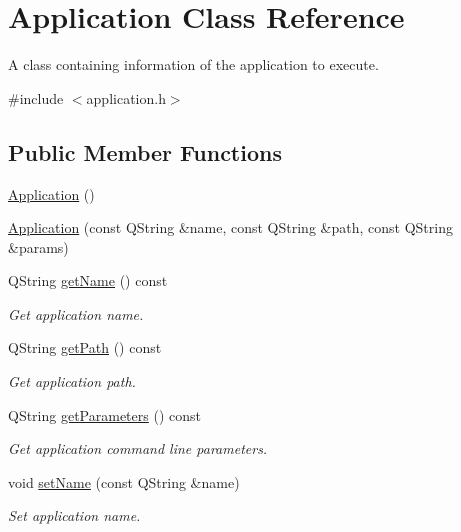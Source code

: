 \hypertarget{class_application}{\section{Application Class Reference}
\label{class_application}
}


A class containing information of the application to execute.  




{\ttfamily \#include $<$application.\-h$>$}

\subsection*{Public Member Functions}
\begin{DoxyCompactItemize}
\item 
\hyperlink{class_application_afa8cc05ce6b6092be5ecdfdae44e05f8}{Application} ()
\item 
\hyperlink{class_application_aeade5684af804439775edea7da862d2b}{Application} (const Q\-String \&name, const Q\-String \&path, const Q\-String \&params)
\item 
Q\-String \hyperlink{class_application_ab0003683f6e2d33336e61b94c8441056}{get\-Name} () const 
\begin{DoxyCompactList}\small\item\em Get application name. \end{DoxyCompactList}\item 
Q\-String \hyperlink{class_application_a93e54a12df6ff9ad94375beee018b9f3}{get\-Path} () const 
\begin{DoxyCompactList}\small\item\em Get application path. \end{DoxyCompactList}\item 
Q\-String \hyperlink{class_application_a19f7bf1539bfc1c333c24aea196af3c2}{get\-Parameters} () const 
\begin{DoxyCompactList}\small\item\em Get application command line parameters. \end{DoxyCompactList}\item 
void \hyperlink{class_application_a50960dfd796beb96df99807b8785b0d2}{set\-Name} (const Q\-String \&name)
\begin{DoxyCompactList}\small\item\em Set application name. \end{DoxyCompactList}\item 

\end{DoxyCompactItemize}
